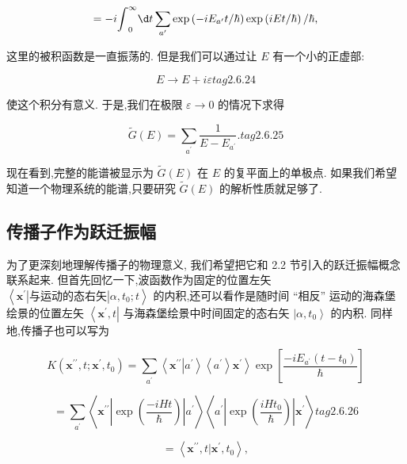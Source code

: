 \documentclass[lang=cn,newtx,10pt,scheme=chinese,thmcnt=section]{elegantbook}
\begin{document}
$$
= - i{\int }_{0}^{\infty }{\d t}\mathop{\sum }\limits_{{a}^{\prime }}\exp \left( {-i{E}_{{a}^{\prime }}t/\hbar }\right) \exp \left( {{iEt}/\hbar }\right) /\hbar ,
$$

这里的被积函数是一直振荡的. 但是我们可以通过让 $E$ 有一个小的正虚部:

$$
E \rightarrow E + {i\varepsilon } tag{2.6.24}
$$

使这个积分有意义. 于是,我们在极限 $\varepsilon \rightarrow 0$ 的情况下求得

$$
\widetilde{G}\left( E\right) = \mathop{\sum }\limits_{{a}^{\prime }}\frac{1}{E - {E}_{{a}^{\prime }}}. tag{2.6.25}
$$

现在看到,完整的能谱被显示为 $\widetilde{G}\left( E\right)$ 在 $E$ 的复平面上的单极点. 如果我们希望知道一个物理系统的能谱,只要研究 $\widetilde{G}\left( E\right)$ 的解析性质就足够了.

\subsection*{传播子作为跃迁振幅}
为了更深刻地理解传播子的物理意义, 我们希望把它和 2.2 节引入的跃迁振幅概念联系起来. 但首先回忆一下,波函数作为固定的位置左矢 $\left\langle {{\mathbf{x}}^{\prime } | \text{与运动的态右矢} | \alpha ,{t}_{0};t}\right\rangle$ 的内积,还可以看作是随时间 “相反” 运动的海森堡绘景的位置左矢 $\left\langle {{\mathbf{x}}^{\prime }, t}\right|$ 与海森堡绘景中时间固定的态右矢 $\left| {\alpha ,{t}_{0}}\right\rangle$ 的内积. 同样地,传播子也可以写为

$$
K\left( {{\mathbf{x}}^{\prime \prime }, t;{\mathbf{x}}^{\prime },{t}_{0}}\right) = \mathop{\sum }\limits_{{a}^{\prime }}\left\langle {{\mathbf{x}}^{\prime \prime }\left| {a}^{\prime }\right\rangle \left\langle {a}^{\prime }\right\rangle {\mathbf{x}}^{\prime }}\right\rangle \exp \left\lbrack \frac{-i{E}_{{a}^{\prime }}\left( {t - {t}_{0}}\right) }{\hbar }\right\rbrack
$$

$$
= \mathop{\sum }\limits_{{a}^{\prime }}\left\langle {{\mathbf{x}}^{\prime \prime }\left| {\exp \left( \frac{-{iHt}}{\hbar }\right) }\right| {a}^{\prime }}\right\rangle \left\langle {{a}^{\prime }\left| {\exp \left( \frac{{iH}{t}_{0}}{\hbar }\right) }\right| {\mathbf{x}}^{\prime }}\right\rangle tag{2.6.26}
$$

$$
= \left\langle {{\mathbf{x}}^{\prime \prime }, t | {\mathbf{x}}^{\prime },{t}_{0}}\right\rangle ,
$$
\end{document}

